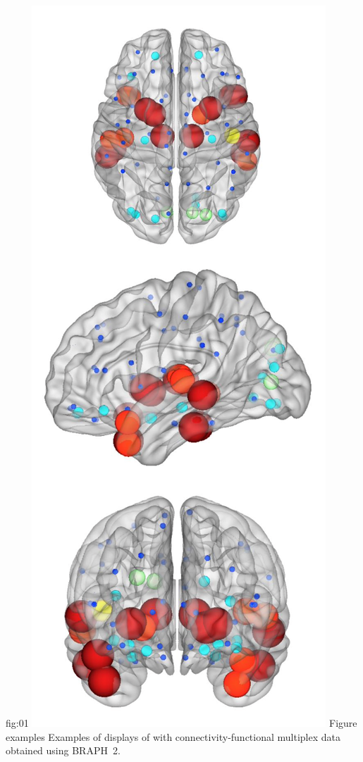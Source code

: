 \documentclass[justified]{tufte-handout}
\begin{document}
	{fig:01}
	{\includegraphics{fig01.png}}
	{Figure examples}
	{
	Examples of displays of  with connectivity-functional multiplex data obtained using BRAPH~2.
	}
\end{document}
